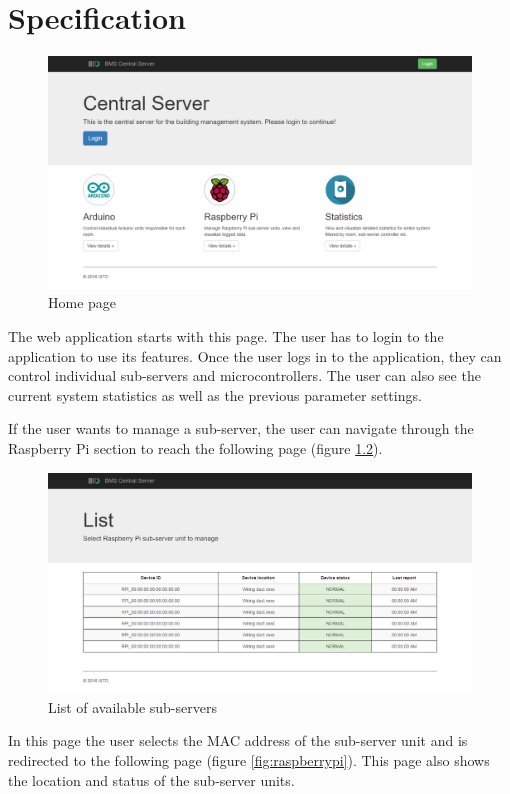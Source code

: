 \documentclass[letterpaper,11pt]{report}
\begin{document}
\chapter{Specification}\label{chapter:Specification}
\onehalfspacing
\begin{figure}[h]
\includegraphics[width=\textwidth]{index}
\centering
\captionsetup{justification=centering}
\caption{Home page}
\label{fig:index}
\end{figure}
The web application starts with this page. The user has to login to the application to use its features. Once the user logs in to the application, they can control individual sub-servers and microcontrollers. The user can also see the current system statistics as well as the previous parameter settings.
\par
If the user wants to manage a sub-server, the user can navigate through the Raspberry Pi section to reach the following page (figure \ref{fig:list}).

\newpage
\begin{figure}[h]
\includegraphics[width=\textwidth]{list}
\centering
\captionsetup{justification=centering}
\caption{List of available sub-servers}
\label{fig:list}
\end{figure}
In this page the user selects the MAC address of the sub-server unit and is redirected to the following page (figure \ref{fig:raspberrypi}). This page also shows the location and status of the sub-server units.
\end{document}
